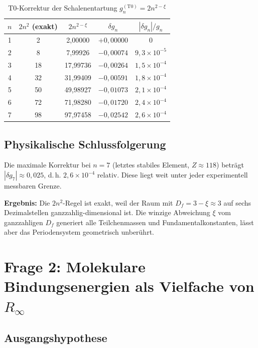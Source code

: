 \begin{table}[htbp]
\centering
\caption{T0-Korrektur der Schalenentartung $g_n^{(\mathrm{T0})} = 2n^{2-\xi}$}
\label{tab:gn-korrektur}
\begin{tabular}{ccccc}
\hline
$n$ & $2n^2$ (exakt) & $2n^{2-\xi}$ & $\delta g_n$ & $|\delta g_n|/g_n$ \\
\hline
1 &  2 & 2{,}00000 & $+0{,}00000$ & $0$ \\
2 &  8 & 7{,}99926 & $-0{,}00074$ & $9{,}3 \times 10^{-5}$ \\
3 & 18 & 17{,}99736& $-0{,}00264$ & $1{,}5 \times 10^{-4}$ \\
4 & 32 & 31{,}99409& $-0{,}00591$ & $1{,}8 \times 10^{-4}$ \\
5 & 50 & 49{,}98927& $-0{,}01073$ & $2{,}1 \times 10^{-4}$ \\
6 & 72 & 71{,}98280& $-0{,}01720$ & $2{,}4 \times 10^{-4}$ \\
7 & 98 & 97{,}97458& $-0{,}02542$ & $2{,}6 \times 10^{-4}$ \\
\hline
\end{tabular}
\end{table}

\subsection{Physikalische Schlussfolgerung}
\label{subsec:schluss-gn}

Die maximale Korrektur bei $n=7$ (letztes stabiles Element, $Z \approx 118$)
beträgt $|\delta g_7| \approx 0{,}025$, d.\,h. $2{,}6 \times 10^{-4}$ relativ.
Diese liegt weit unter jeder experimentell messbaren Grenze.

\textbf{Ergebnis:} Die $2n^2$-Regel ist exakt, weil der Raum mit
$D_f = 3 - \xi \approx 3$ auf sechs Dezimalstellen ganzzahlig-dimensional ist.
Die winzige Abweichung $\xi$ vom ganzzahligen $D_f$ generiert alle
Teilchenmassen und Fundamentalkonstanten, lässt aber das Periodensystem
geometrisch unberührt.

\section{Frage 2: Molekulare Bindungsenergien als Vielfache von \texorpdfstring{$R_\infty$}{R\_inf}}
\label{sec:bindungsenergien}

\subsection{Ausgangshypothese}
\label{subsec:hypothese-be}

